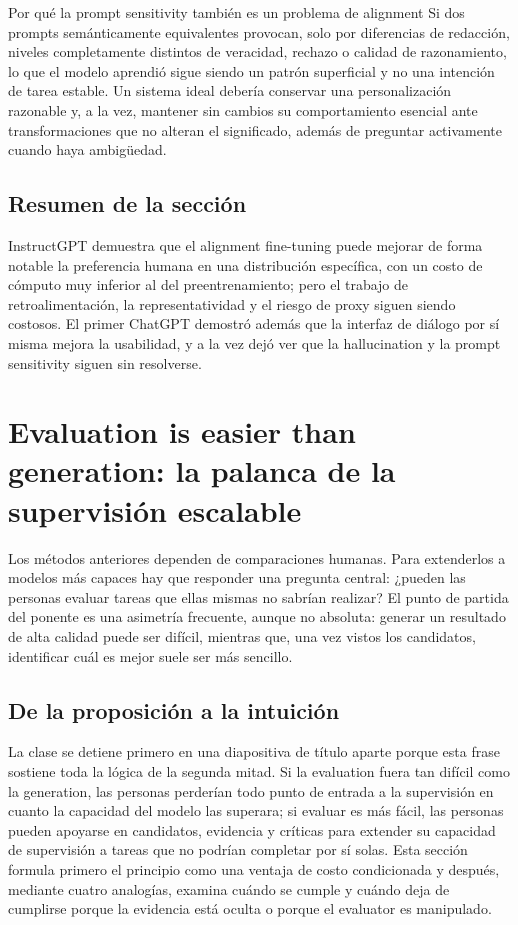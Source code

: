 \documentclass[a4paper]{article}
\begin{document}
\begin{importantbox}{Por qué la prompt sensitivity también es un problema de alignment}
Si dos prompts semánticamente equivalentes provocan, solo por diferencias de redacción, niveles completamente distintos de veracidad, rechazo o calidad de razonamiento, lo que el modelo aprendió sigue siendo un patrón superficial y no una intención de tarea estable. Un sistema ideal debería conservar una personalización razonable y, a la vez, mantener sin cambios su comportamiento esencial ante transformaciones que no alteran el significado, además de preguntar activamente cuando haya ambigüedad.
\end{importantbox}

\subsection{Resumen de la sección}

InstructGPT demuestra que el alignment fine-tuning puede mejorar de forma notable la preferencia humana en una distribución específica, con un costo de cómputo muy inferior al del preentrenamiento; pero el trabajo de retroalimentación, la representatividad y el riesgo de proxy siguen siendo costosos. El primer ChatGPT demostró además que la interfaz de diálogo por sí misma mejora la usabilidad, y a la vez dejó ver que la hallucination y la prompt sensitivity siguen sin resolverse.
\section{Evaluation is easier than generation: la palanca de la supervisión escalable}

Los métodos anteriores dependen de comparaciones humanas. Para extenderlos a modelos más capaces hay que responder una pregunta central: ¿pueden las personas evaluar tareas que ellas mismas no sabrían realizar? El punto de partida del ponente es una asimetría frecuente, aunque no absoluta: generar un resultado de alta calidad puede ser difícil, mientras que, una vez vistos los candidatos, identificar cuál es mejor suele ser más sencillo.

\subsection{De la proposición a la intuición}

La clase se detiene primero en una diapositiva de título aparte porque esta frase sostiene toda la lógica de la segunda mitad. Si la evaluation fuera tan difícil como la generation, las personas perderían todo punto de entrada a la supervisión en cuanto la capacidad del modelo las superara; si evaluar es más fácil, las personas pueden apoyarse en candidatos, evidencia y críticas para extender su capacidad de supervisión a tareas que no podrían completar por sí solas. Esta sección formula primero el principio como una ventaja de costo condicionada y después, mediante cuatro analogías, examina cuándo se cumple y cuándo deja de cumplirse porque la evidencia está oculta o porque el evaluator es manipulado.
\end{document}
